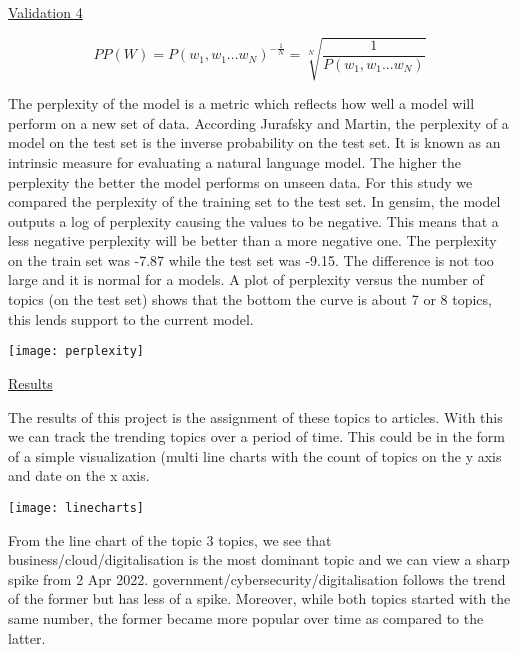 \documentclass{article}
\begin{document}
\begin{titlepage}
\begin{itemize}
\pagebreak

\underline{Validation 4}


		$$PP(W) = P(w_1,w_1...w_N)^{-\frac{1}{N}}=\sqrt[N]{\frac{1}{P(w_1,w_1...w_N)}}$$
		

		\quad The perplexity of the model is a metric which reflects how well a model will perform on a new set of data. According Jurafsky and Martin, the perplexity of a model on the test set is the inverse probability on the test set. It is known as an intrinsic measure for evaluating a natural language model. The higher the perplexity the better the model performs on unseen data. For this study we compared the perplexity of the training set to the test set. In gensim, the model outputs a log of perplexity causing the values to be negative. This means that a less negative perplexity will be better than a more negative one. The perplexity on the train set was -7.87 while the test set was -9.15. The difference is not too large and it is normal for a models. A plot of perplexity versus the number of topics (on the test set) shows that the bottom the curve is about 7 or 8  topics, this lends support to the current model.
		
	\begin{center}
\texttt{[image: perplexity]}

\end{center}
		 \pagebreak
		 
\underline{Results}
            
            \quad The results of this project is the assignment of these topics to articles. With this we can track the trending topics over a period of time. This could be in the form of a simple visualization (multi line charts with the count of topics on the y axis and date on the x axis. 
                 
\begin{center}
\texttt{[image: linecharts]}

\end{center}
            
            \quad From the line chart of the topic 3 topics, we see that business/cloud/digitalisation is the most dominant topic and we can view a sharp spike from 2 Apr 2022. government/cybersecurity/digitalisation follows the trend of the former but has less of a spike. Moreover, while both topics started with the same number, the former became more popular over time as compared to the latter.
            

\end{itemize}
\end{titlepage}
\end{document}
